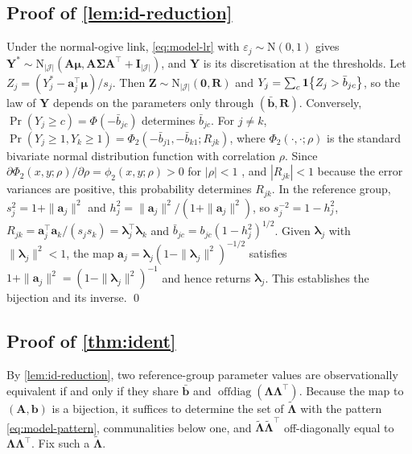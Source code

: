 \subsection{Proof of \texorpdfstring{\cref{lem:id-reduction}}{the reduction lemma}}\label{app:pm-reduction}

Under the normal-ogive link, \eqref{eq:model-lr} with $\varepsilon_j\sim\mathrm N(0,1)$ gives $\bm Y^*\sim\mathrm N_{|\mathcal J|}(\bm A\bm\mu,\bm A\bm\Sigma\bm A^\top+\bm I_{|\mathcal J|})$, and $\bm Y$ is its discretisation at the thresholds. Let $Z_j=(Y^*_j-\bm a_j^\top\bm\mu)/s_j$. Then $\bm Z\sim\mathrm N_{|\mathcal J|}(\bm0,\bm R)$ and $Y_j=\sum_c\mathbf{1}\!\left\{Z_j>\bar b_{jc}\right\}$, so the law of $\bm Y$ depends on the parameters only through $(\bar{\bm b},\bm R)$. Conversely, $\Pr(Y_j\ge c)=\Phi(-\bar b_{jc})$ determines $\bar b_{jc}$. For $j\neq k$, $\Pr(Y_j\ge1,Y_k\ge1)=\Phi_2(-\bar b_{j1},-\bar b_{k1};R_{jk})$, where $\Phi_2(\cdot,\cdot;\rho)$ is the standard bivariate normal distribution function with correlation $\rho$. Since $\partial\Phi_2(x,y;\rho)/\partial\rho=\phi_2(x,y;\rho)>0$ for $|\rho|<1$ \citep{plackett1954}, and $|R_{jk}|<1$ because the error variances are positive, this probability determines $R_{jk}$. In the reference group, $s_j^2=1+\|\bm a_j\|^2$ and $h_j^2=\|\bm a_j\|^2/(1+\|\bm a_j\|^2)$, so $s_j^{-2}=1-h_j^2$, $R_{jk}=\bm a_j^\top\bm a_k/(s_js_k)=\bm\lambda_j^\top\bm\lambda_k$ and $\bar b_{jc}=b_{jc}(1-h_j^2)^{1/2}$. Given $\bm\lambda_j$ with $\|\bm\lambda_j\|^2<1$, the map $\bm a_j=\bm\lambda_j(1-\|\bm\lambda_j\|^2)^{-1/2}$ satisfies $1+\|\bm a_j\|^2=(1-\|\bm\lambda_j\|^2)^{-1}$ and hence returns $\bm\lambda_j$. This establishes the bijection and its inverse. \qed

\subsection{Proof of \texorpdfstring{\cref{thm:ident}}{the identification theorem}}\label{app:pm-ident}

By \cref{lem:id-reduction}, two reference-group parameter values are observationally equivalent if and only if they share $\bar{\bm b}$ and $\operatorname{offdiag}(\bm\Lambda\bm\Lambda^\top)$. Because the map to $(\bm A,\bm b)$ is a bijection, it suffices to determine the set of $\tilde{\bm\Lambda}$ with the pattern \eqref{eq:model-pattern}, communalities below one, and $\tilde{\bm\Lambda}\tilde{\bm\Lambda}^\top$ off-diagonally equal to $\bm\Lambda\bm\Lambda^\top$. Fix such a $\tilde{\bm\Lambda}$.

